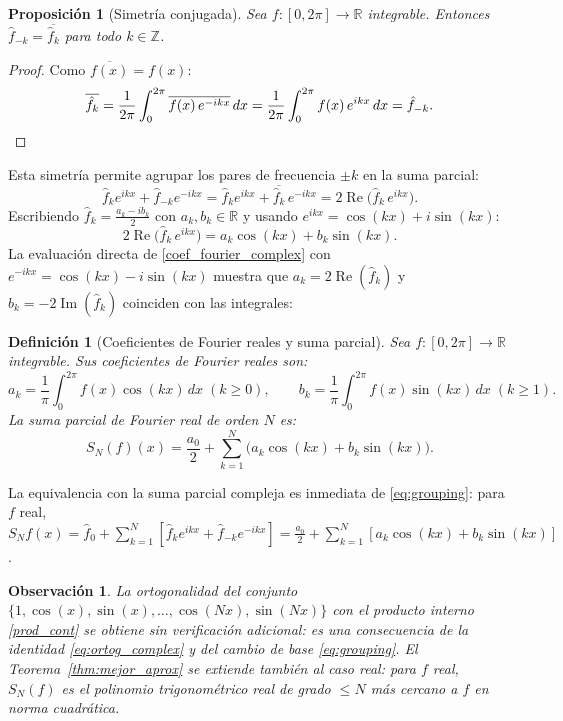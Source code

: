 \documentclass[a4paper,11pt]{report}
\newtheorem{definition}[theorem]{Definición}
\newtheorem{proposition}[theorem]{Proposición}
\newtheorem{remark}[theorem]{Observación}
\begin{document}
\begin{proposition}[Simetría conjugada]\label{prop:conj_simetria}
Sea $f:[0,2\pi]\to\mathbb{R}$ integrable. Entonces $\hat{f}_{-k} = \overline{\hat{f}_k}$ para todo $k\in\mathbb{Z}$.
\end{proposition}

\begin{proof}
Como $\overline{f(x)} = f(x)$:
\[
\overline{\hat{f}_k} = \frac{1}{2\pi}\int_0^{2\pi}\overline{f(x)\,e^{-ikx}}\,dx = \frac{1}{2\pi}\int_0^{2\pi}f(x)\,e^{ikx}\,dx = \hat{f}_{-k}. \qedhere
\]
\end{proof}

Esta simetría permite agrupar los pares de frecuencia $\pm k$ en la suma parcial:
\begin{equation}\label{eq:grouping}
\hat{f}_k e^{ikx} + \hat{f}_{-k}e^{-ikx}
= \hat{f}_k e^{ikx} + \overline{\hat{f}_k}\,e^{-ikx}
= 2\operatorname{Re}\!\bigl(\hat{f}_k\,e^{ikx}\bigr).
\end{equation}
Escribiendo $\hat{f}_k = \tfrac{a_k - ib_k}{2}$ con $a_k, b_k \in \mathbb{R}$ y usando $e^{ikx}=\cos(kx)+i\sin(kx)$:
\[
2\operatorname{Re}\!\bigl(\hat{f}_k\,e^{ikx}\bigr) = a_k\cos(kx) + b_k\sin(kx).
\]
La evaluación directa de \eqref{coef_fourier_complex} con $e^{-ikx}=\cos(kx)-i\sin(kx)$ muestra que $a_k = 2\operatorname{Re}(\hat{f}_k)$ y $b_k = -2\operatorname{Im}(\hat{f}_k)$ coinciden con las integrales:

\begin{definition}[Coeficientes de Fourier reales y suma parcial]\label{def:fourier_real}
Sea $f:[0,2\pi]\to\mathbb{R}$ integrable. Sus coeficientes de Fourier reales son:
\begin{equation}\label{coef_fourier_real}
a_k = \frac{1}{\pi}\int_0^{2\pi}f(x)\cos(kx)\,dx \;(k\ge 0),
\qquad
b_k = \frac{1}{\pi}\int_0^{2\pi}f(x)\sin(kx)\,dx \;(k\ge 1).
\end{equation}
La suma parcial de Fourier real de orden $N$ es:
\begin{equation}\label{SN_real}
S_N(f)(x) = \frac{a_0}{2} + \sum_{k=1}^N \bigl(a_k\cos(kx)+b_k\sin(kx)\bigr).
\end{equation}
\end{definition}

La equivalencia con la suma parcial compleja es inmediata de \eqref{eq:grouping}: para $f$ real, $S_Nf(x) = \hat{f}_0 + \sum_{k=1}^N[\hat{f}_k e^{ikx}+\hat{f}_{-k}e^{-ikx}] = \frac{a_0}{2}+\sum_{k=1}^N[a_k\cos(kx)+b_k\sin(kx)]$.

\begin{remark}
La ortogonalidad del conjunto $\{1,\cos(x),\sin(x),\ldots,\cos(Nx),\sin(Nx)\}$ con el producto interno \eqref{prod_cont} se obtiene sin verificación adicional: es una consecuencia de la identidad \eqref{eq:ortog_complex} y del cambio de base \eqref{eq:grouping}. El Teorema~\ref{thm:mejor_aprox} se extiende también al caso real: para $f$ real, $S_N(f)$ es el polinomio trigonométrico real de grado $\le N$ más cercano a $f$ en norma cuadrática.
\end{remark}
\end{document}
